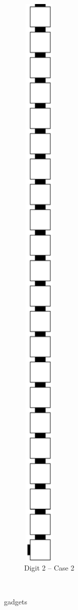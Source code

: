 \begin{itemize}
\begin{figure}[H]
\begin{subfigure}[t]{0.17\textwidth}
                \includegraphics[width=0.17\textwidth]{warping/post_warp_case2_digit2_msr}
                \caption{\label{fig:post_warp_case2_digit2_msr} Digit 2 -- Case 2}
            \end{subfigure}%
            ~
            \caption{\label{fig:post_warp_gadgets} {\postwarp} gadgets }
        \end{figure}

    \end{itemize}
